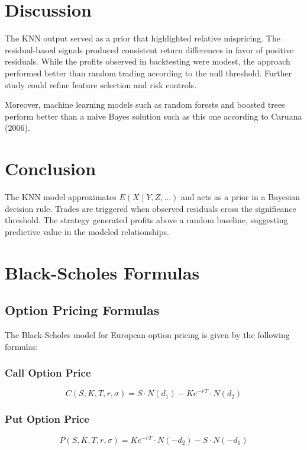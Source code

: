 \documentclass{article}
\begin{document}
\section{Discussion}
The KNN output served as a prior that highlighted relative mispricing. The residual-based signals produced consistent return differences in favor of positive residuals. While the profits observed in backtesting were modest, the approach performed better than random trading according to the null threshold. Further study could refine feature selection and risk controls.

Moreover, machine learning models such as random forests and boosted trees perform better than a naive Bayes solution such as this one according to Caruana (2006).
 
\section{Conclusion}
The KNN model approximates $E(X\mid Y,Z,\ldots)$ and acts as a prior in a Bayesian decision rule. Trades are triggered when observed residuals cross the significance threshold. The strategy generated profits above a random baseline, suggesting predictive value in the modeled relationships.

\appendix
\section{Black-Scholes Formulas}
\subsection{Option Pricing Formulas}
The Black-Scholes model for European option pricing is given by the following formulas:

\subsubsection{Call Option Price}
\begin{equation}
C(S, K, T, r, \sigma) = S \cdot N(d_1) - K e^{-rT} \cdot N(d_2)
\end{equation}

\subsubsection{Put Option Price}
\begin{equation}
P(S, K, T, r, \sigma) = K e^{-rT} \cdot N(-d_2) - S \cdot N(-d_1)
\end{equation}
\end{document}
